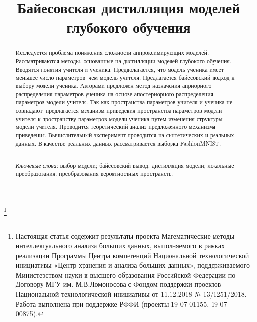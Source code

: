 \documentclass[12pt]{a&t}
\begin{document}


\title{Байесовская дистилляция моделей глубокого обучения}%
\thanks{Настоящая статья содержит результаты проекта Математические методы интеллектуального анализа больших данных, выполняемого в рамках реализации Программы Центра компетенций Национальной технологической инициативы «Центр хранения и анализа больших данных», поддерживаемого Министерством науки и высшего образования Российской Федерации по Договору МГУ им. М.В.Ломоносова с Фондом поддержки проектов Национальной технологической инициативы от 11.12.2018 № 13/1251/2018. Работа выполнена при поддержке РФФИ (проекты 19-07-01155, 19-07-00875).}


\maketitle

\begin{abstract}
Исследуется проблема понижения сложности аппроксимирующих моделей. 
Рассматриваются методы, основанные на дистилляции моделей глубокого обучения. 
Вводятся понятия учителя и ученика. Предполагается, что модель ученика имеет меньшее число параметров, чем модель учителя. 
Предлагается байесовский подход к выбору модели ученика. 
Авторами предложен метод назначения априорного распределения параметров ученика на основе апостериорного распределения параметров модели учителя. 
Так как пространства параметров учителя и ученика не совпадают, предлагается механизм приведения пространства параметров модели учителя к пространству параметров модели ученика путем изменения структуры модели учителя.
Проводится теоретический анализ предложенного механизма приведения. Вычислительный эксперимент проводится на синтетических и реальных данных. В качестве реальных данных рассматривается выборка FashionMNIST.

\smallskip\\
\textit{Ключевые слова}: выбор модели; байесовский вывод; дистилляция модели; локальные преобразования; преобразования вероятностных пространств.
\end{abstract}
\end{document}
